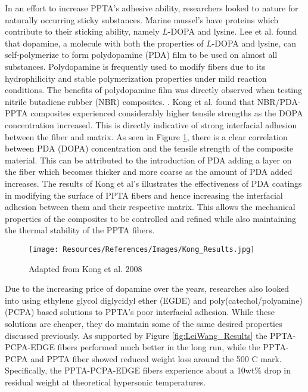 \documentclass[12pt]{article}
\begin{document}
\begin{multicols}{2}
\indent In an effort to increase PPTA's adhesive ability, researchers looked to nature for naturally occurring sticky substances. Marine mussel's have proteins which contribute to their sticking ability, namely $L$-DOPA and lysine. \citep{Waite2001} Lee et al. \citep{Lee2007} found that dopamine, a molecule with both the properties of $L$-DOPA and lysine, can self-polymerize to form polydopamine (PDA) film to be used on almost all substances. \citep{Yuan2017} Polydopamine is frequently used to modify fibers due to its hydrophilicity and stable polymerization properties under mild reaction conditions. The benefits of polydopamine film was directly observed when testing nitrile butadiene rubber (NBR) composites. \citep{Kong2018}. Kong et al. \citep{Kong2018} found that NBR/PDA-PPTA composites experienced considerably higher tensile strengths as the DOPA concentration increased. This is directly indicative of strong interfacial adhesion between the fiber and matrix. As seen in Figure \ref{fig:Kong_Results}, there is a clear correlation between PDA (DOPA) concentration and the tensile strength of the composite material. This can be attributed to the introduction of PDA adding a layer on the fiber which becomes thicker and more coarse as the amount of PDA added increases. The results of Kong et al's \citep{Kong2018} illustrates the effectiveness of PDA coatings in modifying the surface of PPTA fibers and hence increasing the interfacial adhesion between them and their respective matrix. This allows the mechanical properties of the composites to be controlled and refined while also maintaining the thermal stability of the PPTA fibers. 

\begin{figure}[H]
    \centering
    \texttt{[image: Resources/References/Images/Kong\_Results.jpg]}
    \caption{\scriptsize{Adapted from Kong et al. 2008 \citep{Kong2018}}}
    \label{fig:Kong_Results}
\end{figure}

\indent Due to the increasing price of dopamine over the years, researches also looked into using ethylene glycol diglycidyl ether (EGDE) and poly(catechol/polyamine) (PCPA) based solutions to PPTA's poor interfacial adhesion. \citep{LeiWang2017} While these solutions are cheaper, they do maintain some of the same desired properties discussed previously. As supported by Figure \ref{fig:LeiWang_Results} the PPTA-PCPA-EDGE fibers performed much better in the long run, while the PPTA-PCPA and PPTA fiber showed reduced weight loss around the 500 \degree C mark. Specifically, the PPTA-PCPA-EDGE fibers experience about a 10wt\% drop in residual weight at theoretical hypersonic temperatures.


\end{multicols}
\end{document}
